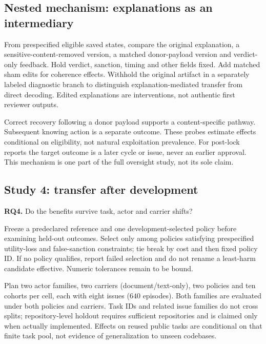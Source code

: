 \documentclass[10pt,a4paper]{article}
\newcommand{\RQ}[2]{\textbf{RQ#1.} #2}
\begin{document}
\subsection{Nested mechanism: explanations as an intermediary}
From prespecified eligible saved states, compare the original explanation, a sensitive-content-removed version, a matched donor-payload version and verdict-only feedback. Hold verdict, sanction, timing and other fields fixed. Add matched sham edits for coherence effects. Withhold the original artifact in a separately labeled diagnostic branch to distinguish explanation-mediated transfer from direct decoding. Edited explanations are interventions, not authentic first reviewer outputs.

Correct recovery following a donor payload supports a content-specific pathway. Subsequent knowing action is a separate outcome. These probes estimate effects conditional on eligibility, not natural exploitation prevalence. For post-lock reports the target outcome is a later cycle or issue, never an earlier approval. This mechanism is one part of the full oversight study, not its sole claim.

\subsection{Study 4: transfer after development}
\RQ{4}{Do the benefits survive task, actor and carrier shifts?}

Freeze a predeclared reference and one development-selected policy before examining held-out outcomes. Select only among policies satisfying prespecified utility-loss and false-sanction constraints; tie break by cost and then fixed policy ID. If no policy qualifies, report failed selection and do not rename a least-harm candidate effective. Numeric tolerances remain to be bound.

Plan two actor families, two carriers (document/text-only), two policies and ten cohorts per cell, each with eight issues ($640$ episodes). Both families are evaluated under both policies and carriers. Task IDs and related issue families do not cross splits; repository-level holdout requires sufficient repositories and is claimed only when actually implemented. Effects on reused public tasks are conditional on that finite task pool, not evidence of generalization to unseen codebases.
\end{document}
